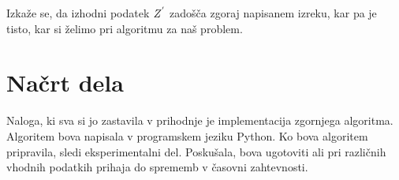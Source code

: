 \documentclass[a4paper,15pt]{article}
\begin{document}
\noindent Izkaže se, da izhodni podatek \(\uppercase{z}^{'}\) zadošča zgoraj napisanem izreku, kar pa je tisto, kar si želimo pri algoritmu za naš problem.

\newpage
\section{Načrt dela}

\noindent Naloga, ki sva si jo zastavila v prihodnje je implementacija zgornjega algoritma. Algoritem bova napisala v programskem jeziku Python.
Ko bova algoritem pripravila, sledi eksperimentalni del. Poskušala, bova ugotoviti ali pri različnih vhodnih podatkih prihaja do sprememb v časovni zahtevnosti. 
\end{document}
